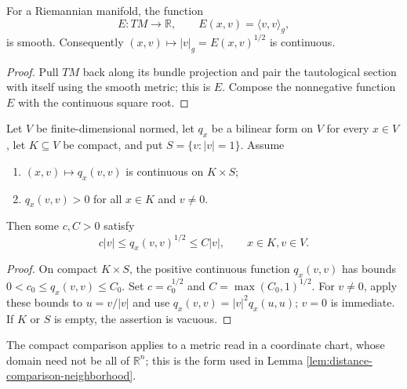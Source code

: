 \begin{lemma}
\label{lem:metric-energy-smooth}





For a Riemannian manifold, the function
\[
E:TM\to\mathbb R,\qquad E(x,v)=\langle v,v\rangle_g,
\]
is smooth. Consequently $(x,v)\mapsto|v|_g=E(x,v)^{1/2}$ is continuous.
\end{lemma}
\begin{proof}

\sketch Pull $TM$ back along its bundle projection and pair the tautological section with itself using the smooth metric; this is $E$. Compose the nonnegative function $E$ with the continuous square root.
\end{proof}

\begin{lemma}
\label{lem:norm-comparison-compact-core}




Let $V$ be finite-dimensional normed, let $q_x$ be a bilinear form on $V$ for every $x\in V$, let $K\subseteq V$ be compact, and put $S=\{v:|v|=1\}$. Assume
\begin{enumerate}
\item[(i)] $(x,v)\mapsto q_x(v,v)$ is continuous on $K\times S$;
\item[(ii)] $q_x(v,v)>0$ for all $x\in K$ and $v\ne0$.
\end{enumerate}
Then some $c,C>0$ satisfy
\[
c|v|\le q_x(v,v)^{1/2}\le C|v|,
\qquad x\in K, v\in V.
\]
\end{lemma}
\begin{proof}

\sketch On compact $K\times S$, the positive continuous function $q_x(v,v)$ has bounds $0<c_0\le q_x(v,v)\le C_0$. Set $c=c_0^{1/2}$ and $C=\max(C_0,1)^{1/2}$. For $v\ne0$, apply these bounds to $u=v/|v|$ and use $q_x(v,v)=|v|^2q_x(u,u)$; $v=0$ is immediate. If $K$ or $S$ is empty, the assertion is vacuous.
\end{proof}

The compact comparison applies to a metric read in a coordinate chart, whose domain need not be all of $\mathbb R^n$; this is the form used in Lemma \ref{lem:distance-comparison-neighborhood}.

